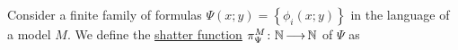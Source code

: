 \documentclass[final]{beamer}
\newcommand{\curly}[1]{\left\{ #1 \right\}}
\newcommand{\defn}{\underline}
\newlength{\sepwid}
\newlength{\twocolwid}
\begin{document}
\begin{frame}[t]
\begin{columns}[t]









\begin{column}{\twocolwid} %

    Consider a finite family of formulas $\Psi(x; y) = \curly{\phi_i(x; y)} $ in the language of a model $M$.
    We define the \defn{shatter function} $\pi^M_\Psi \colon \mathbb{N} \operatorname{\longrightarrow} \mathbb{N}$ of $\Psi$ as


\end{column}
\end{columns}
\end{frame}
\end{document}
